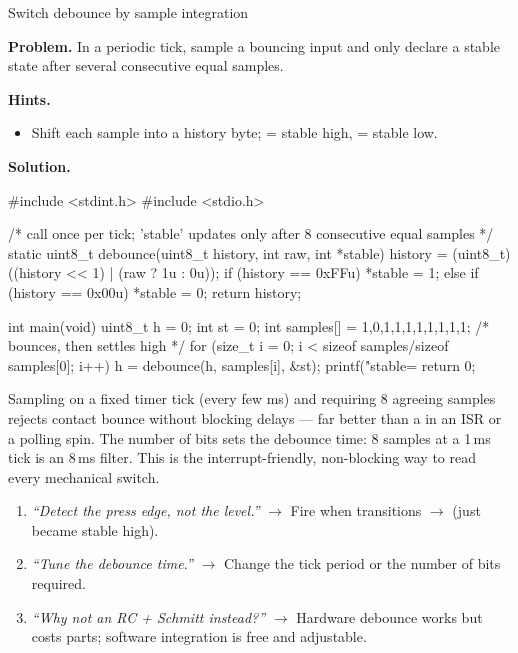 \begin{gymproblem}{Switch debounce by sample integration}

\textbf{Problem.} In a periodic tick, sample a bouncing input and only declare a
stable state after several consecutive equal samples.

\textbf{Hints.}
\begin{itemize}
\item Shift each sample into a history byte;  = stable high,
   = stable low.
\end{itemize}

\attempt

\textbf{Solution.}
\begin{cgym}
#include <stdint.h>
#include <stdio.h>

/* call once per tick; 'stable' updates only after 8 consecutive equal samples */
static uint8_t debounce(uint8_t history, int raw, int *stable) {
    history = (uint8_t)((history << 1) | (raw ? 1u : 0u));
    if (history == 0xFFu)      *stable = 1;
    else if (history == 0x00u) *stable = 0;
    return history;
}

int main(void) {
    uint8_t h = 0; int st = 0;
    int samples[] = {1,0,1,1,1,1,1,1,1,1};   /* bounces, then settles high */
    for (size_t i = 0; i < sizeof samples/sizeof samples[0]; i++)
        h = debounce(h, samples[i], &st);
    printf("stable=%
    return 0;
}
\end{cgym}

Sampling on a fixed timer tick (every few ms) and requiring 8 agreeing samples
rejects contact bounce without blocking delays --- far better than a
 in an ISR or a polling spin. The number of bits sets the
debounce time: 8 samples at a 1\,ms tick is an 8\,ms filter. This is the
interrupt-friendly, non-blocking way to read every mechanical switch.

\followups
\begin{enumerate}
\item \emph{``Detect the press edge, not the level.''} $\rightarrow$ Fire when
   transitions $\rightarrow$ (just became
  stable high).
\item \emph{``Tune the debounce time.''} $\rightarrow$ Change the tick period or
  the number of bits required.
\item \emph{``Why not an RC + Schmitt instead?''} $\rightarrow$ Hardware
  debounce works but costs parts; software integration is free and
  adjustable.
\end{enumerate}
\end{gymproblem}

